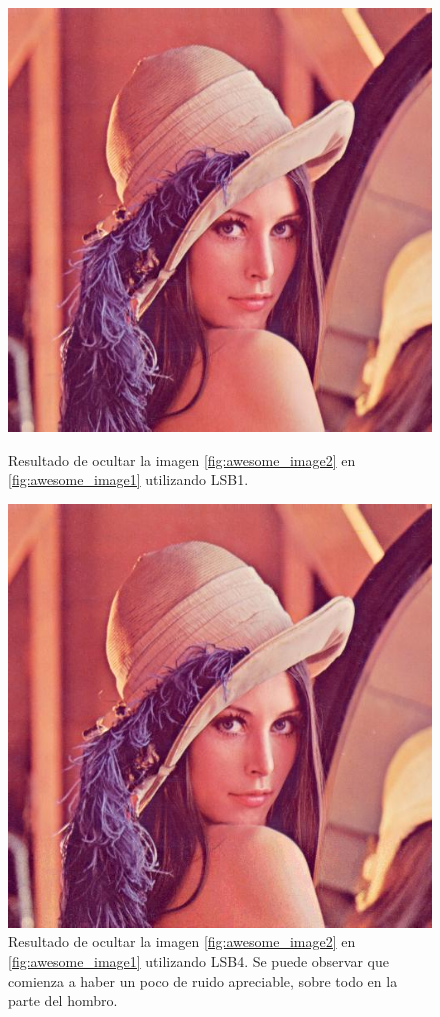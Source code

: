 \documentclass[a4paper,10pt]{article}
\begin{document}
\begin{figure}[!htb]
    \includegraphics[scale=0.5]{./images/lenacolor-lsb1.jpg}
    \caption{Resultado de ocultar la imagen \ref{fig:awesome_image2} en \ref{fig:awesome_image1} utilizando LSB1. }\label{fig:awesome_image3}
\endminipage\hfill
{}
    \includegraphics[scale=0.5]{./images/lenacolor-lsb4.jpg}
    \caption{Resultado de ocultar la imagen \ref{fig:awesome_image2} en \ref{fig:awesome_image1} utilizando LSB4. Se puede observar que comienza a haber un poco de ruido
    apreciable, sobre todo en la parte del hombro.}\label{fig:awesome_image4}
\endminipage\hfill
\end{figure}
\end{document}
